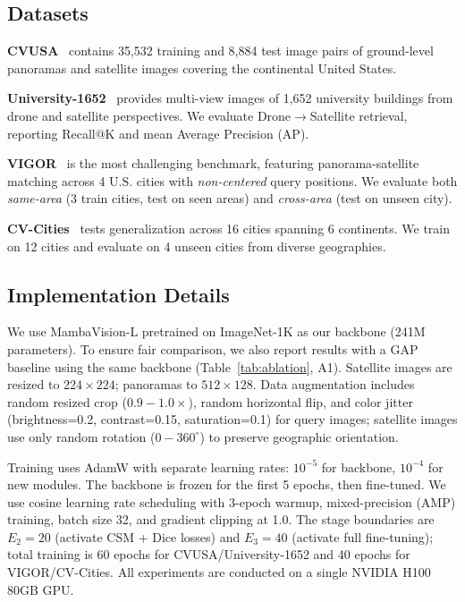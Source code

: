 \documentclass{article}
\begin{document}
\subsection{Datasets}

\textbf{CVUSA}~\cite{cvusa} contains 35,532 training and 8,884 test image pairs of ground-level panoramas and satellite images covering the continental United States.

\textbf{University-1652}~\cite{uni1652} provides multi-view images of 1,652 university buildings from drone and satellite perspectives. We evaluate Drone$\to$Satellite retrieval, reporting Recall@K and mean Average Precision (AP).

\textbf{VIGOR}~\cite{vigor} is the most challenging benchmark, featuring panorama-satellite matching across 4 U.S. cities with \textit{non-centered} query positions. We evaluate both \textit{same-area} (3 train cities, test on seen areas) and \textit{cross-area} (test on unseen city).

\textbf{CV-Cities}~\cite{cvcities} tests generalization across 16 cities spanning 6 continents. We train on 12 cities and evaluate on 4 unseen cities from diverse geographies.

\subsection{Implementation Details}

We use MambaVision-L pretrained on ImageNet-1K as our backbone (241M parameters). To ensure fair comparison, we also report results with a GAP baseline using the same backbone (Table~\ref{tab:ablation}, A1). Satellite images are resized to $224\times224$; panoramas to $512\times128$. Data augmentation includes random resized crop ($0.9{-}1.0\times$), random horizontal flip, and color jitter (brightness=0.2, contrast=0.15, saturation=0.1) for query images; satellite images use only random rotation ($0{-}360^\circ$) to preserve geographic orientation.

Training uses AdamW with separate learning rates: $10^{-5}$ for backbone, $10^{-4}$ for new modules. The backbone is frozen for the first 5 epochs, then fine-tuned. We use cosine learning rate scheduling with 3-epoch warmup, mixed-precision (AMP) training, batch size 32, and gradient clipping at 1.0. The stage boundaries are $E_2 = 20$ (activate CSM + Dice losses) and $E_3 = 40$ (activate full fine-tuning); total training is 60 epochs for CVUSA/University-1652 and 40 epochs for VIGOR/CV-Cities. All experiments are conducted on a single NVIDIA H100 80GB GPU.
\end{document}
